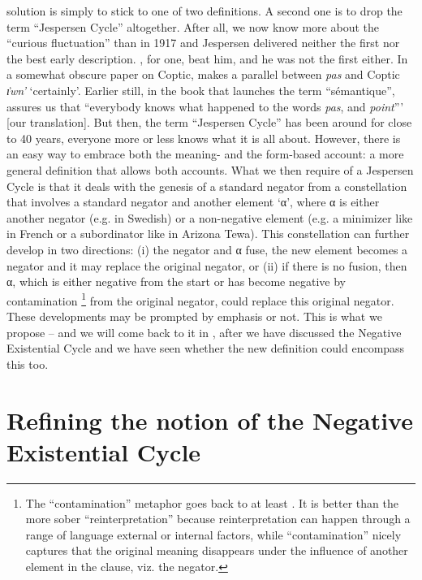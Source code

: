 ﻿\documentclass[output=paper,draft,draftmode,colorlinks,citecolor=brown]{langscibook}
\begin{document}
solution is simply to stick to one of two definitions. A second one is to
drop the term ``Jespersen Cycle'' altogether. After all, we now know more
about the ``curious fluctuation'' than in 1917 and Jespersen delivered
neither the first nor the best early description. \textcite{Meillet1912}, for
one, beat him, and he was not the first either. In a somewhat obscure paper
on Coptic, \textcite{Gardiner1904} makes a parallel between \textit{pas} and
Coptic \textit{ı͗wn'} `certainly'. Earlier still, in the book that launches
the term ``sémantique'', \textcite[22]{Breal1897} assures us that ``everybody
knows what happened to the words \textit{pas}, and \textit{point}''' [our
translation]. But then, the term ``Jespersen Cycle'' has been around for
close to 40 years, everyone more or less knows what it is all about.
However, there is an easy way to embrace both the meaning- and the
form-based account: a more general definition that allows both accounts.
What we then require of a Jespersen Cycle is that it deals with the genesis
of a standard negator  from a constellation that involves a standard
negator and another element `α', where α is either another negator (e.g. in
Swedish) or a non-negative element (e.g. a minimizer like in
French or a
subordinator like in Arizona Tewa). This constellation can further develop
in two directions: (i) the negator and α fuse, the new element becomes a
negator and it may replace the original negator, or (ii) if there is no
fusion, then α, which is either negative from the start or has become
negative by contamination%
%
\footnote{The ``contamination'' metaphor goes
back to at least \textcite[221--226]{Breal1897}. It is better than the more
sober ``reinterpretation'' because reinterpretation can happen through a
range of language external or internal factors, while ``contamination''
nicely captures that the original meaning disappears under the influence of
another element in the clause, viz. the negator.} %
%
from the original
negator, could replace this original negator. These developments may be
prompted by emphasis or not. This is what we propose -- and we will come
back to it in , after we have discussed the Negative Existential
Cycle and we have seen whether the new definition could encompass this too. 

\section{Refining the notion of the Negative Existential Cycle}\label{sec:int-3}
\end{document}
